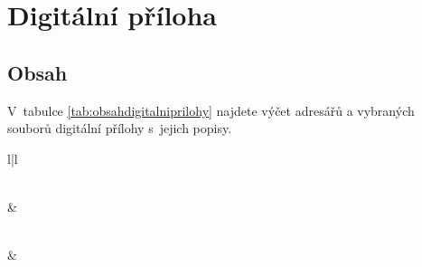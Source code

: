 \chapter{Digitální příloha}
\section{Obsah}
V~tabulce \ref{tab:obsahdigitalniprilohy} najdete výčet adresářů a vybraných souborů digitální přílohy s~jejich popisy.
\begin{longtable}{l|l}
\caption{Obsah digitální přílohy} \label{tab:obsahdigitalniprilohy} \\
 &  \\ \hline 
\endfirsthead

%
{{\tablename\ \thetable{}}} \\
 &
 \\ \hline 
\endhead


\end{longtable}
